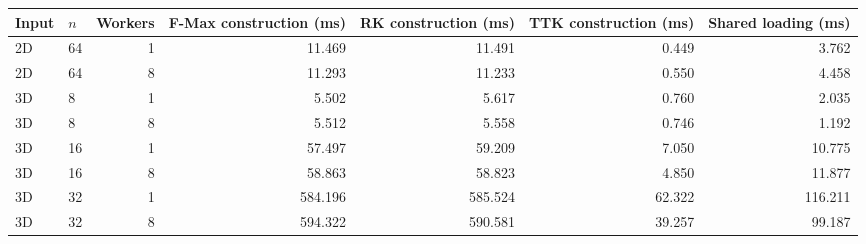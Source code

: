 \begin{tabular}{llrrrrr}
\hline
Input & $n$ & Workers & F-Max construction (ms) & RK construction (ms) & TTK construction (ms) & Shared loading (ms) \\
\hline
2D & 64 & 1 & 11.469 & 11.491 & 0.449 & 3.762 \\
2D & 64 & 8 & 11.293 & 11.233 & 0.550 & 4.458 \\
3D & 8 & 1 & 5.502 & 5.617 & 0.760 & 2.035 \\
3D & 8 & 8 & 5.512 & 5.558 & 0.746 & 1.192 \\
3D & 16 & 1 & 57.497 & 59.209 & 7.050 & 10.775 \\
3D & 16 & 8 & 58.863 & 58.823 & 4.850 & 11.877 \\
3D & 32 & 1 & 584.196 & 585.524 & 62.322 & 116.211 \\
3D & 32 & 8 & 594.322 & 590.581 & 39.257 & 99.187 \\
\hline
\end{tabular}
